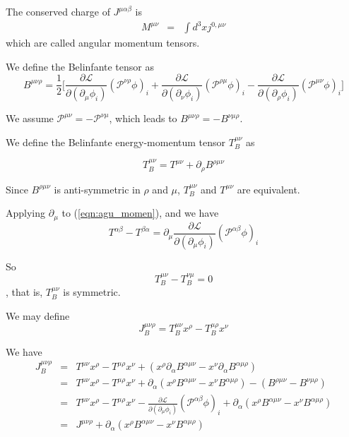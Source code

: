 \documentclass[12pt]{book}
\begin{document}
	The conserved charge of $J^{\mu\alpha\beta}$ is 
	\begin{eqnarray}
		M^{\mu\nu}&=&\int d^3xj^{0,\mu\nu}
	\end{eqnarray}
	which are called angular momentum tensors.
	
	We define the Belinfante tensor as
	\begin{equation}
		B^{\mu\nu\rho}=\frac 12\Big[\frac{\partial\mathcal L}{\partial(\partial_\mu\phi_i)}(\mathcal P^{\nu\rho}\phi)_i+\frac{\partial\mathcal L}{\partial(\partial_\nu\phi_i)}(\mathcal P^{\rho\mu}\phi)_i-\frac{\partial\mathcal L}{\partial(\partial_\rho\phi_i)}(\mathcal P^{\mu\nu}\phi)_i\Big]
	\end{equation}
	
	We assume $\mathcal P^{\mu\nu}=-\mathcal P^{\nu\mu}$, which leads to $B^{\mu\nu\rho}=-B^{\nu\mu\rho}$. 
	
	We define the Belinfante energy-momentum tensor $T_B^{\mu\nu}$ as
	
	\begin{equation}
		T_B^{\mu\nu}=T^{\mu\nu}+\partial_\rho B^{\rho\mu\nu}
	\end{equation}
	
	Since $B^{\rho\mu\nu}$ is anti-symmetric in $\rho$ and $\mu$, $T_B^{\mu\nu}$ and $T^{\mu\nu}$ are equivalent.
	
	Applying $\partial_\mu$ to (\ref{eqn:agu_momen}), and we have
	\begin{equation}
		T^{\alpha\beta}-T^{\beta\alpha}=\partial_\mu\frac{\partial\mathcal{L}}{\partial(\partial_\mu\phi_i)}(\mathcal P^{\alpha\beta}\phi)_i
	\end{equation}
	
	So
	\begin{equation}
		T_B^{\mu\nu}-T_B^{\nu\mu}=0
	\end{equation},
	that is, $T_B^{\mu\nu}$ is symmetric.
	
	We may define
	\begin{equation}
		J_B^{\mu\nu\rho}=T_B^{\mu\nu}x^\rho-T_B^{\mu\rho}x^\nu
	\end{equation}
	
	We have
	\begin{eqnarray}
		J_B^{\mu\nu\rho}&=&T^{\mu\nu}x^\rho-T^{\mu\rho}x^\nu+(x^\rho\partial_\alpha B^{\alpha\mu\nu}-x^\nu\partial_\alpha B^{\alpha\mu\rho})\\
		&=&T^{\mu\nu}x^\rho-T^{\mu\rho}x^\nu+\partial_\alpha(x^\rho B^{\alpha\mu\nu}-x^\nu B^{\alpha\mu\rho})-(B^{\rho\mu\nu}- B^{\nu\mu\rho})\\
		&=&T^{\mu\nu}x^\rho-T^{\mu\rho}x^\nu-\frac{\partial\mathcal{L}}{\partial(\partial_\mu\phi_i)}(\mathcal P^{\alpha\beta}\phi)_i+\partial_\alpha(x^\rho B^{\alpha\mu\nu}-x^\nu B^{\alpha\mu\rho})\\
		&=&J^{\mu\nu\rho}+\partial_\alpha(x^\rho B^{\alpha\mu\nu}-x^\nu B^{\alpha\mu\rho})
	\end{eqnarray}
	
\end{document}
